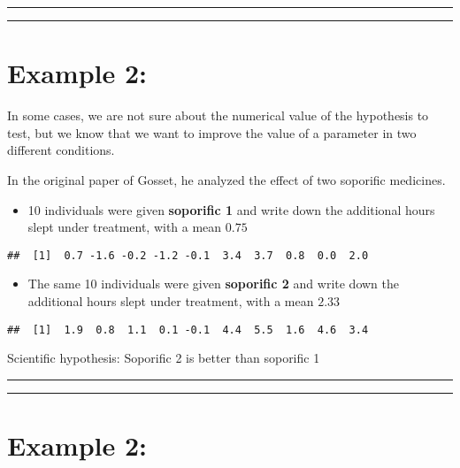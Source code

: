 \documentclass[
]{book}
\providecommand{\tightlist}{%
  \setlength{\itemsep}{0pt}\setlength{\parskip}{0pt}}
\begin{document}
\begin{center}\rule{0.5\linewidth}{0.5pt}\end{center}

\begin{center}\rule{0.5\linewidth}{0.5pt}\end{center}

\hypertarget{example-2-3}{%
\section{Example 2:}\label{example-2-3}}

In some cases, we are not sure about the numerical value of the hypothesis to test, but we know that we want to improve the value of a parameter in two different conditions.

In the original paper of Gosset, he analyzed the effect of two soporific medicines.

\begin{itemize}
\tightlist
\item
  10 individuals were given \textbf{soporific 1} and write down the additional hours slept under treatment, with a mean \(0.75\)
\end{itemize}

\begin{verbatim}
##  [1]  0.7 -1.6 -0.2 -1.2 -0.1  3.4  3.7  0.8  0.0  2.0
\end{verbatim}

\begin{itemize}
\tightlist
\item
  The same 10 individuals were given \textbf{soporific 2} and write down the additional hours slept under treatment, with a mean \(2.33\)
\end{itemize}

\begin{verbatim}
##  [1]  1.9  0.8  1.1  0.1 -0.1  4.4  5.5  1.6  4.6  3.4
\end{verbatim}

Scientific hypothesis: Soporific 2 is better than soporific 1

\begin{center}\rule{0.5\linewidth}{0.5pt}\end{center}

\begin{center}\rule{0.5\linewidth}{0.5pt}\end{center}

\hypertarget{example-2-4}{%
\section{Example 2:}\label{example-2-4}}
\end{document}
